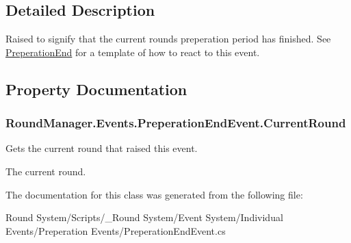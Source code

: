 \subsection{Detailed Description}
Raised to signify that the current rounds preperation period has finished. See \hyperlink{class_round_manager_1_1_preperation_end}{Preperation\+End} for a template of how to react to this event. 



\subsection{Property Documentation}
\hypertarget{class_round_manager_1_1_events_1_1_preperation_end_event_a66c6c85f8cd0a6ead13051f2ae73e286}{}
\subsubsection[{Current\+Round}]{ Round\+Manager.\+Events.\+Preperation\+End\+Event.\+Current\+Round\hspace{0.3cm}{\ttfamily [get]}}\label{class_round_manager_1_1_events_1_1_preperation_end_event_a66c6c85f8cd0a6ead13051f2ae73e286}


Gets the current round that raised this event. 

The current round.

The documentation for this class was generated from the following file\+:\begin{DoxyCompactItemize}
\item 
Round System/\+Scripts/\+\_\+\+Round System/\+Event System/\+Individual Events/\+Preperation Events/Preperation\+End\+Event.\+cs\end{DoxyCompactItemize}
